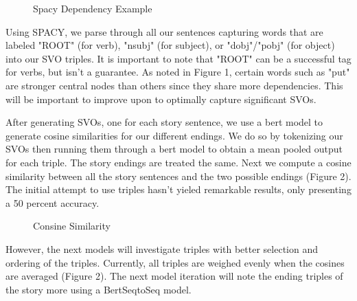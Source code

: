 \documentclass{article}
\begin{document}
\begin{multicols}{2}
\begin{figure}[H]
    \centering
    \caption{Spacy Dependency Example}
\end{figure}

Using SPACY, we parse through all our sentences capturing words that are labeled "ROOT" (for verb), "nsubj" (for subject), or "dobj"/"pobj" (for object) 
into our SVO triples. It is important to note that "ROOT" can be a successful tag for verbs, but isn't a guarantee. As noted in Figure 1, certain words 
such as "put" are stronger central nodes than others since they share more dependencies.  This will be important to improve upon to optimally capture 
significant SVOs.

After generating SVOs, one for each story sentence, we use a bert model to generate cosine similarities for our different endings. We do so by
tokenizing our SVOs then running them through a bert model to obtain a mean pooled output for each triple. The story endings are treated the same.
Next we compute a cosine similarity between all the story sentences and the two possible endings (Figure 2). The initial attempt to use triples hasn't yieled
 remarkable results, only presenting a 50 percent accuracy.

\begin{figure}[H]
    \centering
    \caption{Consine Similarity}
\end{figure}

However, the next models will investigate triples with better selection and ordering of the triples. Currently, all triples are weighed evenly 
when the cosines are averaged (Figure 2). The next model iteration will note the ending triples of the story more using a BertSeqtoSeq model. 

\end{multicols}
\end{document}
